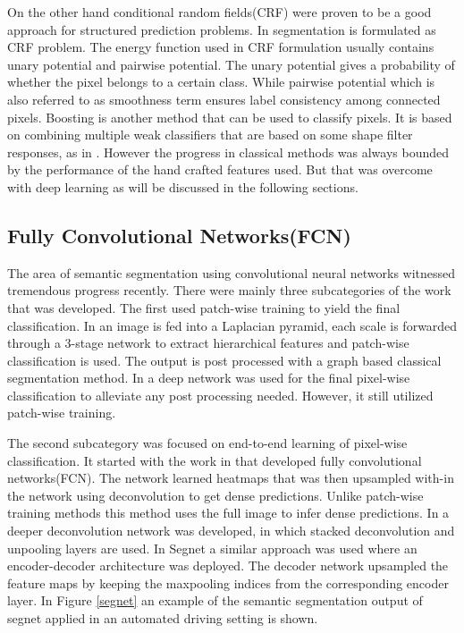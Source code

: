 \documentclass[conference]{IEEEtran}
\begin{document}
On the other hand conditional random fields(CRF) were proven to be a good approach for structured prediction problems. In \cite{sturgess2009combining}\cite{russell2009associative} segmentation is formulated as CRF problem. The energy function used in CRF formulation usually contains unary potential and pairwise potential. The unary potential gives a probability of whether the pixel belongs to a certain class. While pairwise potential which is also referred to as smoothness term ensures label consistency among connected pixels. Boosting is another method that can be used to classify pixels. It is based on combining multiple weak classifiers that are based on some shape filter responses, as in \cite{sturgess2009combining}\cite{shotton2006textonboost}. However the progress in classical methods was always bounded by the performance of the hand crafted features used. But that was overcome with deep learning as will be discussed in the following sections.

\subsection{Fully Convolutional Networks(FCN)}
The area of semantic segmentation using convolutional neural networks witnessed tremendous progress recently. There were mainly three subcategories of the work that was developed. The first \cite{farabet2013learning}\cite{farabet2012scene}\cite{grangier2009deep} used patch-wise training to yield the final classification. In\cite{farabet2013learning} an image is fed into a Laplacian pyramid, each scale is forwarded through a 3-stage network to extract hierarchical features and patch-wise classification is used. The output is post processed with a graph based classical segmentation method. In \cite{grangier2009deep} a deep network was used for the final pixel-wise classification to alleviate any post processing needed. However, it still utilized patch-wise training. 

The second subcategory \cite{long2015fully}\cite{noh2015learning}\cite{badrinarayanan2015segnet} was focused on end-to-end learning of pixel-wise classification.  It started with the work in \cite{long2015fully} that developed fully convolutional networks(FCN). The network learned heatmaps that was then upsampled with-in the network using deconvolution to get dense predictions. Unlike patch-wise training methods this method uses the full image to infer dense predictions.  In \cite{noh2015learning} a deeper deconvolution network was developed, in which stacked deconvolution and unpooling layers are used. In Segnet \cite{badrinarayanan2015segnet} a similar approach was used where an encoder-decoder architecture was deployed. The decoder network upsampled the feature maps by keeping the maxpooling indices from the corresponding encoder layer. In Figure \ref{segnet} an example of the semantic segmentation output of segnet applied in an automated driving setting is shown.
\end{document}
